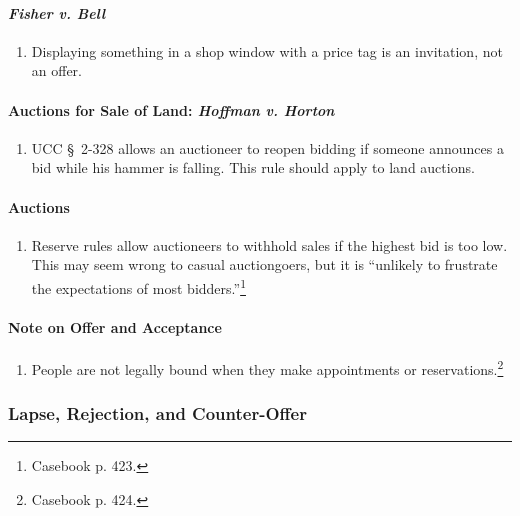 \paragraph{\emph{Fisher v. Bell}}

\begin{enumerate}
    \item Displaying something in a shop window with a price tag is an invitation, not an offer.
\end{enumerate}

\paragraph{Auctions for Sale of Land: \emph{Hoffman v. Horton}}

\begin{enumerate}
    \item UCC \S\ 2-328 allows an auctioneer to reopen bidding if someone 
    announces a bid while his hammer is falling. This rule should apply to 
    land auctions.
\end{enumerate}

\paragraph{Auctions}

\begin{enumerate}
    \item Reserve rules allow auctioneers to withhold sales if the highest bid 
    is too low. This may seem wrong to casual auctiongoers, but it is 
    ``unlikely to frustrate the expectations of most 
    bidders.''\footnote{Casebook p. 423.}
\end{enumerate}

\paragraph{Note on Offer and Acceptance}

\begin{enumerate}
    \item People are not legally bound when they make appointments or 
    reservations.\footnote{Casebook p. 424.}
\end{enumerate}

\subsubsection{Lapse, Rejection, and Counter-Offer}

